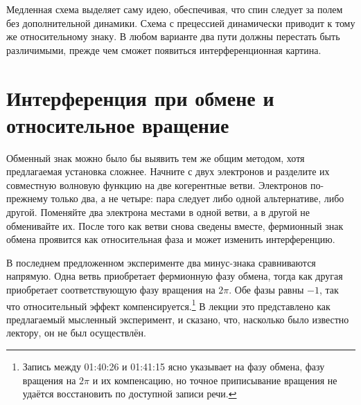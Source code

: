 Медленная схема выделяет саму идею, обеспечивая, что спин следует за полем без дополнительной динамики. Схема с прецессией динамически приводит к тому же относительному знаку. В любом варианте два пути должны перестать быть различимыми, прежде чем сможет появиться интерференционная картина.

\begin{classroomqa}
\end{classroomqa}

\begin{classroomqa}
\end{classroomqa}

\section{Интерференция при обмене и относительное вращение}

Обменный знак можно было бы выявить тем же общим методом, хотя предлагаемая установка сложнее. Начните с двух электронов и разделите их совместную волновую функцию на две когерентные ветви. Электронов по-прежнему только два, а не четыре: пара следует либо одной альтернативе, либо другой. Поменяйте два электрона местами в одной ветви, а в другой не обменивайте их. После того как ветви снова сведены вместе, фермионный знак обмена проявится как относительная фаза и может изменить интерференцию.

В последнем предложенном эксперименте два минус-знака сравниваются напрямую. Одна ветвь приобретает фермионную фазу обмена, тогда как другая приобретает соответствующую фазу вращения на \(2\pi\). Обе фазы равны \(-1\), так что относительный эффект компенсируется.\footnote{Запись между 01:40:26 и 01:41:15 ясно указывает на фазу обмена, фазу вращения на \(2\pi\) и их компенсацию, но точное приписывание вращения не удаётся восстановить по доступной записи речи.} В лекции это представлено как предлагаемый мысленный эксперимент, и сказано, что, насколько было известно лектору, он не был осуществлён.

